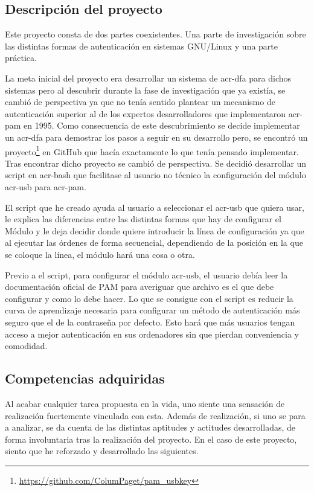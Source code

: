 \documentclass[twoside, titlepage, 12pt, a4paper]{article}
\begin{document}
\subsection{Descripción del proyecto}
Este proyecto consta de dos partes coexistentes. Una parte de investigación sobre las distintas formas de autenticación en sistemas \gls{GNU/Linux} y una parte práctica.\par
La meta inicial del proyecto era desarrollar un sistema de \gls{acr-dfa} para dichos sistemas pero al descubrir durante la fase de investigación que ya existía, se cambió de perspectiva ya que no tenía sentido plantear un mecanismo de autenticación superior al de los expertos desarrolladores que implementaron \gls{acr-pam} en 1995. Como consecuencia de este descubrimiento se decide implementar un \gls{acr-dfa} para demostrar los pasos a seguir en su desarrollo pero, se encontró un proyecto\footnote{\url{https://github.com/ColumPaget/pam_usbkey}} en \gls{GitHub} que hacía exactamente lo que tenía pensado implementar. Tras encontrar dicho proyecto se cambió de perspectiva. Se decidió desarrollar un \gls{script} en \gls{acr-bash} que facilitase al usuario no técnico la configuración del módulo \gls{acr-usb} para \gls{acr-pam}.\par
El \gls{script} que he creado ayuda al usuario a seleccionar el \gls{acr-usb} que quiera usar, le explica las diferencias entre las distintas formas que hay de configurar el Módulo y le deja decidir donde quiere introducir la línea de configuración ya que al ejecutar las órdenes de forma secuencial, dependiendo de la posición en la que se coloque la línea, el módulo hará una cosa o otra. \par
Previo a el \gls{script}, para configurar el módulo \gls{acr-usb}, el usuario debía leer la documentación oficial de PAM para averiguar que archivo es el que debe configurar y como lo debe hacer. Lo que se consigue con el \gls{script} es reducir la curva de aprendizaje necesaria para configurar un método de autenticación más seguro que el de la contraseña por defecto. Esto hará que más usuarios tengan acceso a mejor autenticación en sus ordenadores sin que pierdan conveniencia y comodidad.
\subsection{Competencias adquiridas}
Al acabar cualquier tarea propuesta en la vida, uno siente una sensación de realización fuertemente vinculada con esta. Además de realización, si uno se para a analizar, se da cuenta de las distintas aptitudes y actitudes desarrolladas, de forma involuntaria tras la realización del proyecto. En el caso de este proyecto, siento que he reforzado y desarrollado las siguientes.
\end{document}
